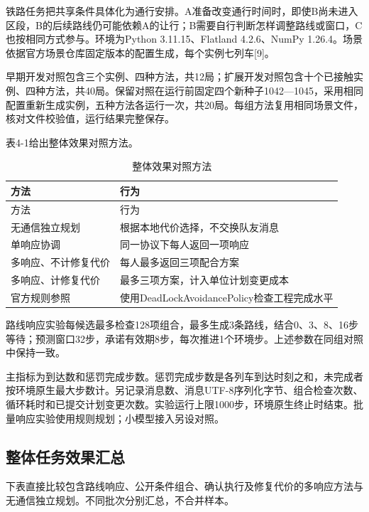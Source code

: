 铁路任务把共享条件具体化为通行安排。A准备改变通行时间时，即使B尚未进入区段，B的后续路线仍可能依赖A的让行；B需要自行判断怎样调整路线或窗口，C也按相同方式参与。环境为Python
3.11.15、Flatland 4.2.6、NumPy
1.26.4。场景依据官方场景仓库固定版本的配置生成，每个实例七列车{[}9{]}。

早期开发对照包含三个实例、四种方法，共12局；扩展开发对照包含十个已接触实例、四种方法，共40局。保留对照在运行前固定四个新种子1042---1045，采用相同配置重新生成实例，五种方法各运行一次，共20局。每组方法复用相同场景文件，核对文件校验值，运行结果完整保存。

表4-1给出整体效果对照方法。

\begin{longtable}[]{@{}>{\raggedright\arraybackslash}p{\dimexpr(\linewidth-12pt)/2\relax}>{\raggedright\arraybackslash}p{\dimexpr(\linewidth-12pt)/2\relax}@{}}
\caption{整体效果对照方法}\tabularnewline
\toprule
方法 & 行为 \\
\midrule
\endfirsthead
\toprule
方法 & 行为 \\
\midrule
\endhead
无通信独立规划 & 根据本地代价选择，不交换队友消息 \\
单响应协调 & 同一协议下每人返回一项响应 \\
多响应、不计修复代价 & 每人最多返回三项配合方案 \\
多响应、计修复代价 & 最多三项方案，计入单位计划变更成本 \\
官方规则参照 & 使用DeadLockAvoidancePolicy检查工程完成水平 \\
\bottomrule
\end{longtable}

路线响应实验每候选最多检查128项组合，最多生成3条路线，结合0、3、8、16步等待；预测窗口32步，承诺有效期8步，每次推进1个环境步。上述参数在同组对照中保持一致。

主指标为到达数和惩罚完成步数。惩罚完成步数是各列车到达时刻之和，未完成者按环境原生最大步数计。另记录消息数、消息UTF-8序列化字节、组合检查次数、循环耗时和已提交计划变更次数。实验运行上限1000步，环境原生终止时结束。批量响应实验使用规则规划；小模型接入另设对照。

\hypertarget{ux6574ux4f53ux4efbux52a1ux6548ux679cux6c47ux603b}{%
\subsection{整体任务效果汇总}\label{ux6574ux4f53ux4efbux52a1ux6548ux679cux6c47ux603b}}

下表直接比较包含路线响应、公开条件组合、确认执行及修复代价的多响应方法与无通信独立规划。不同批次分别汇总，不合并样本。

